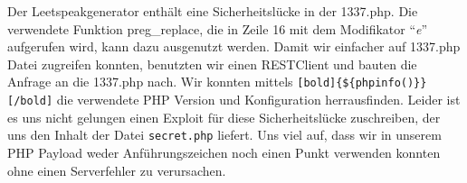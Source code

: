 \documentclass[10pt,a4paper]{article}
\begin{document}
Der Leetspeakgenerator enthält eine Sicherheitslücke in der 1337.php. Die verwendete Funktion preg\_replace, die in Zeile 16 mit dem Modifikator "`\textit{e}"' aufgerufen wird, kann dazu ausgenutzt werden. Damit wir einfacher auf 1337.php Datei zugreifen konnten, benutzten wir einen RESTClient und bauten die Anfrage an die 1337.php nach. Wir konnten mittels \texttt{[bold]\{\$\{phpinfo()\}\}[/bold]} die verwendete PHP Version und Konfiguration herrausfinden. Leider ist es uns nicht gelungen einen Exploit für diese Sicherheitslücke zuschreiben, der uns den Inhalt der Datei \texttt{secret.php} liefert. Uns viel auf, dass wir in unserem PHP Payload weder Anführungszeichen noch einen Punkt verwenden konnten ohne einen Serverfehler zu verursachen.
\end{document}

